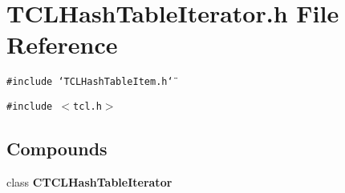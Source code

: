 \section{TCLHash\-Table\-Iterator.h File Reference}
\label{TCLHashTableIterator_8h}
{\tt \#include \char`\"{}TCLHash\-Table\-Item.h\char`\"{}}\par
{\tt \#include $<$tcl.h$>$}\par
\subsection*{Compounds}
\begin{CompactItemize}
\item 
class {\bf CTCLHash\-Table\-Iterator}
\end{CompactItemize}
